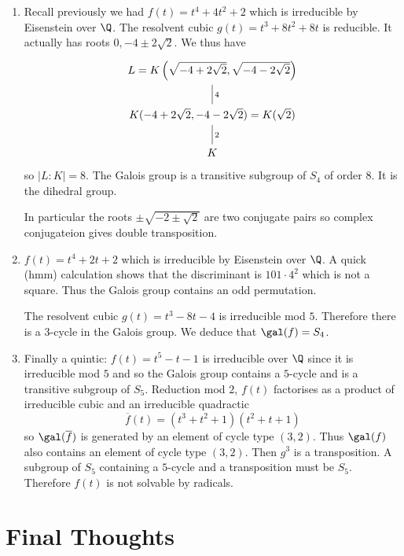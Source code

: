 \documentclass[a4paper]{article}
\newcommand*{\red}[1]{\overline{#1}}
\begin{document}
\begin{eg}\leavevmode
  \begin{enumerate}
  \item Recall previously we had \(f(t) = t^4 + 4t^2 + 2\) which is irreducible by Eisenstein over \(\Q\). The resolvent cubic \(g(t) = t^3 + 8t^2 + 8t\) is reducible. It actually has roots \(0, -4 \pm 2\sqrt 2\). We thus have
    \[
      \begin{tikzcd}
        L = K \left(\sqrt{-4 + 2\sqrt 2}, \sqrt{-4 - 2\sqrt 2} \right) \ar[d, dash, "4"] \\
        K(-4 + 2\sqrt 2, -4 - 2\sqrt 2) = K(\sqrt 2) \ar[d, dash, "2"] \\
        K
      \end{tikzcd}
    \]
    so \(|L:K| = 8\). The Galois group is a transitive subgroup of \(S_4\) of order \(8\). It is the dihedral group.

    In particular the roots \(\pm \sqrt{-2 \pm \sqrt 2}\) are two conjugate pairs so complex conjugateion gives double transposition.
  \item \(f(t) = t^4 + 2t + 2\) which is irreducible by Eisenstein over \(\Q\). A quick (hmm) calculation shows that the discriminant is \(101 \cdot 4^2\) which is not a square. Thus the Galois group contains an odd permutation.

    The resolvent cubic \(g(t) = t^3 - 8t - 4\) is irreducible mod \(5\). Therefore there is a \(3\)-cycle in the Galois group. We deduce that \(\gal(f) = S_4\).
  \item Finally a quintic: \(f(t) = t^5 - t - 1\) is irreducible over \(\Q\) since it is irreducible mod \(5\) and so the Galois group contains a \(5\)-cycle and is a transitive subgroup of \(S_5\). Reduction mod \(2\), \(f(t)\) factorises as a product of irreducible cubic and an irreducible quadractic
    \[
      \red f(t) = (t^3 + t^2 + 1)(t^2 + t + 1)
    \]
    so \(\gal(\red f)\) is generated
    by an element of cycle type \((3, 2)\). Thus \(\gal(f)\) also contains an element of cycle type \((3, 2)\). Then \(g^3\) is a transposition. A subgroup of \(S_5\) containing a \(5\)-cycle and a transposition must be \(S_5\). Therefore \(f(t)\) is not solvable by radicals.
  \end{enumerate}
\end{eg}

\section{Final Thoughts}
\end{document}
